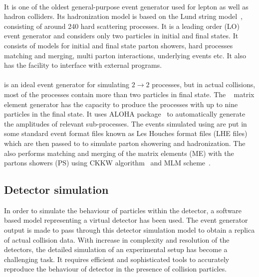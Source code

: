 \paragraph{\pythia}
\hspace{\parindent} It is one of the oldest general-purpose event generator used for lepton as well as hadron colliders.
Its hadronization model is based on the Lund string model~\cite{Sjostrand:1986hx},
consisting of around 240 hard scattering processes. It is a leading order (LO) event generator and
considers only two particles in initial and final states. It consists of models for initial and final state parton showers, hard processes matching and
merging, multi parton interactions, underlying events etc. It also has the facility to interface with external programs. 
\paragraph{\madgraph}
\hspace{\parindent} \pythia is an ideal event generator for simulating $2\rightarrow{2}$ processes, but in actual collisions, most of the processes contain
more than two particles in final state. The \madgraph~\cite{Alwall:2014hca} matrix element generator has the capacity to produce the processes with up to
nine particles in the final state. It uses ALOHA package~\cite{deAquino:2011ub} to automatically generate the amplitudes of relevant sub-processes.
The events simulated using \madgraph are put in some standard event format files known as Les Houches format files (LHE files)~\cite{Alwall:2006yp} which
are then passed to \pythia to simulate parton showering and hadronization. The \pythia also performs matching and merging of the matrix elements (ME)
with the partons showers (PS) using CKKW algorithm~\cite{Krauss:2002up} and MLM scheme~\cite{Mangano:2001xp}.
\subsection{Detector simulation}
In order to simulate the behaviour of particles within the detector, a software based model representing a virtual detector has been used.
The event generator output is made to pass through this detector simulation model to obtain a replica of actual collision data.
With increase in complexity and resolution of the detectors, the detailed simulation of an experimental setup has become a challenging task. It
requires efficient and sophisticated tools to accurately reproduce the behaviour of detector in the presence of collision particles.

